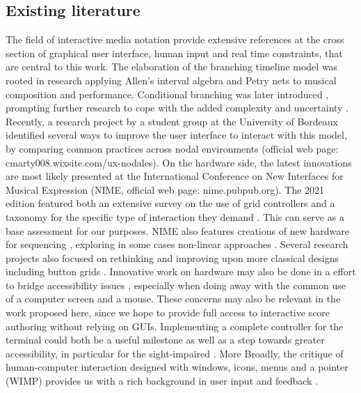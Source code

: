 \documentclass[journal,onecolumn]{IEEEtran}
\begin{document}

\subsection{Existing literature}
The field of interactive media notation \cite{ircam:antescofo}\cite{buzzing:iannix}\cite{grame:inscore} provide extensive references at the cross section of graphical user interface, human input and real time constraints, that are central to this work. 
The elaboration of the branching timeline model was rooted in research applying Allen's interval algebra \cite{allombert:constraint} and Petry nets \cite{allombert:petri} to musical composition and performance. Conditional branching was later introduced \cite{toro:condition}, prompting further research to cope with the added complexity and uncertainty \cite{arias:colour}. Recently, a research project by a student group at the University of Bordeaux identified several ways to improve the user interface to interact with this model, by comparing common practices across nodal environments (official web page: cmarty008.wixsite.com/ux-nodales). On the hardware side, the latest innovations are most likely presented at the International Conference on New Interfaces for Musical Expression (NIME, official web page: nime.pubpub.org). The 2021 edition featured both an extensive survey on the use of grid controllers \cite{rossmy:grid} and a taxonomy for the specific type of interaction they demand \cite{pust:taxonomy}. This can serve as a base assessment for our purposes. 
NIME also features creations of new hardware for sequencing \cite{arellano:radear}, exploring in some cases non-linear approaches \cite{hayes:neurohedron}. Several research projects also focused on rethinking and improving upon more classical designs \cite{snyder:jd} including button grids \cite{rossmy:touch}. Innovative work on hardware may also be done in a effort to bridge accessibility issues \cite{forester:loopblocks}\cite{vetter:tangible}, especially when doing away with the common use of a computer screen and a mouse. These concerns may also be relevant in the work proposed here, since we hope to provide full access to interactive score authoring without relying on GUIs. Implementing a complete controller for the terminal could both be a useful milestone as well as a step towards greater accessibility, in particular for the sight-impaired \cite{payne:blind}. More Broadly, the critique of human-computer interaction designed with windows, icons, menus and a pointer (WIMP) provides us with a rich background in user input and feedback \cite{baudouin:instrumental}\cite{beaudouin:interaction}. 
\end{document}
